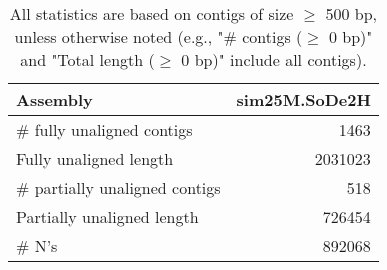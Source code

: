 \documentclass[12pt,a4paper]{article}
\begin{document}
\begin{table}[ht]
\begin{center}
\caption{All statistics are based on contigs of size $\geq$ 500 bp, unless otherwise noted (e.g., "\# contigs ($\geq$ 0 bp)" and "Total length ($\geq$ 0 bp)" include all contigs).}
\begin{tabular}{|l*{1}{|r}|}
\hline
Assembly & sim25M.SoDe2H \\ \hline
\# fully unaligned contigs & 1463 \\ \hline
Fully unaligned length & 2031023 \\ \hline
\# partially unaligned contigs & 518 \\ \hline
Partially unaligned length & 726454 \\ \hline
\# N's & 892068 \\ \hline
\end{tabular}
\end{center}
\end{table}
\end{document}
